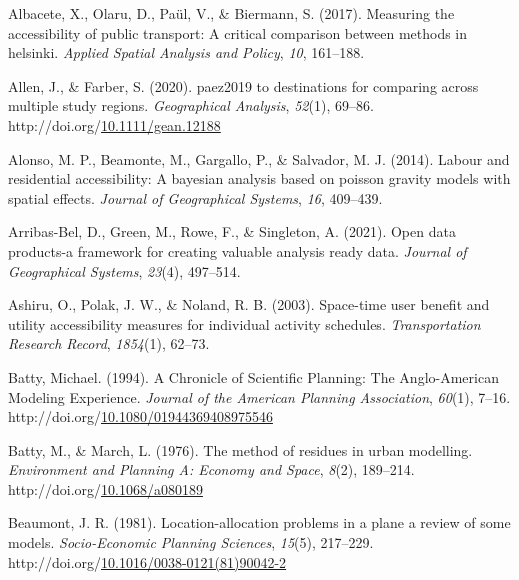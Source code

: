 \documentclass[
11pt, %
oneside, %
english, %
singlespacing, %
]{macthesis} %
\newlength{\cslhangindent}
\newenvironment{CSLReferences}[2] %
{\begin{list}{}{%
	\setlength{\itemindent}{0pt}
	\setlength{\leftmargin}{0pt}
	\setlength{\parsep}{0pt}
	\ifodd #1
	\setlength{\leftmargin}{\cslhangindent}
	\setlength{\itemindent}{-1\cslhangindent}
	\fi
	\setlength{\itemsep}{#2\baselineskip}}}
{\end{list}}
\begin{document}
\label{refs}
\begin{CSLReferences}{1}{0}
Albacete, X., Olaru, D., Paül, V., \& Biermann, S. (2017). Measuring the accessibility of public transport: A critical comparison between methods in helsinki. \emph{Applied Spatial Analysis and Policy}, \emph{10}, 161--188.

Allen, J., \& Farber, S. (2020). paez2019 to destinations for comparing across multiple study regions. \emph{Geographical Analysis}, \emph{52}(1), 69--86. http://doi.org/\href{https://doi.org/10.1111/gean.12188}{10.1111/gean.12188}

Alonso, M. P., Beamonte, M., Gargallo, P., \& Salvador, M. J. (2014). Labour and residential accessibility: A bayesian analysis based on poisson gravity models with spatial effects. \emph{Journal of Geographical Systems}, \emph{16}, 409--439.

Arribas-Bel, D., Green, M., Rowe, F., \& Singleton, A. (2021). Open data products-a framework for creating valuable analysis ready data. \emph{Journal of Geographical Systems}, \emph{23}(4), 497--514.

Ashiru, O., Polak, J. W., \& Noland, R. B. (2003). Space-time user benefit and utility accessibility measures for individual activity schedules. \emph{Transportation Research Record}, \emph{1854}(1), 62--73.

Batty, Michael. (1994). A {Chronicle} of {Scientific} {Planning}: {The} {Anglo}-{American} {Modeling} {Experience}. \emph{Journal of the American Planning Association}, \emph{60}(1), 7--16. http://doi.org/\href{https://doi.org/10.1080/01944369408975546}{10.1080/01944369408975546}

Batty, M., \& March, L. (1976). The method of residues in urban modelling. \emph{Environment and Planning A: Economy and Space}, \emph{8}(2), 189--214. http://doi.org/\href{https://doi.org/10.1068/a080189}{10.1068/a080189}

Beaumont, J. R. (1981). Location-allocation problems in a plane a review of some models. \emph{Socio-Economic Planning Sciences}, \emph{15}(5), 217--229. http://doi.org/\href{https://doi.org/10.1016/0038-0121(81)90042-2}{10.1016/0038-0121(81)90042-2}


\end{CSLReferences}
\end{document}
